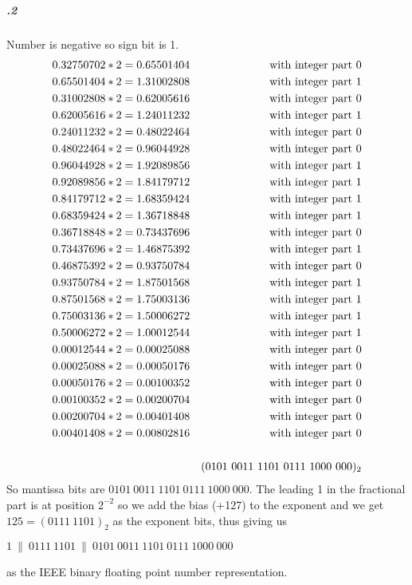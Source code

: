 \documentclass[11pt,letterpaper]{article}
\begin{document}
		\subparagraph{.2}
		Number is negative so sign bit is 1.
		\begin{align*}
		0.32750702 * 2 &= 0.65501404&\textnormal{with integer part 0}\\
		0.65501404 * 2 &= 1.31002808&\textnormal{with integer part 1}\\
		0.31002808 * 2 &= 0.62005616&\textnormal{with integer part 0}\\
		0.62005616 * 2 &= 1.24011232&\textnormal{with integer part 1}\\
		0.24011232 * 2 &= 0.48022464&\textnormal{with integer part 0}\\
		0.48022464 * 2 &= 0.96044928&\textnormal{with integer part 0}\\
		0.96044928 * 2 &= 1.92089856&\textnormal{with integer part 1}\\
		0.92089856 * 2 &= 1.84179712&\textnormal{with integer part 1}\\
		0.84179712 * 2 &= 1.68359424&\textnormal{with integer part 1}\\
		0.68359424 * 2 &= 1.36718848&\textnormal{with integer part 1}\\
		0.36718848 * 2 &= 0.73437696&\textnormal{with integer part 0}\\
		0.73437696 * 2 &= 1.46875392&\textnormal{with integer part 1}\\
		0.46875392 * 2 &= 0.93750784&\textnormal{with integer part 0}\\
		0.93750784 * 2 &= 1.87501568&\textnormal{with integer part 1}\\
		0.87501568 * 2 &= 1.75003136&\textnormal{with integer part 1}\\
		0.75003136 * 2 &= 1.50006272&\textnormal{with integer part 1}\\
		0.50006272 * 2 &= 1.00012544&\textnormal{with integer part 1}\\
		0.00012544 * 2 &= 0.00025088&\textnormal{with integer part 0}\\
		0.00025088 * 2 &= 0.00050176&\textnormal{with integer part 0}\\
		0.00050176 * 2 &= 0.00100352&\textnormal{with integer part 0}\\
		0.00100352 * 2 &= 0.00200704&\textnormal{with integer part 0}\\
		0.00200704 * 2 &= 0.00401408&\textnormal{with integer part 0}\\
		0.00401408 * 2 &= 0.00802816&\textnormal{with integer part 0}\\
		\\
		&&(0101\ 0011\ 1101\ 0111\ 1000\ 000)_2
		\end{align*}
		So mantissa bits are $0101\ 0011\ 1101\ 0111\ 1000\ 000$.\newline
		The leading 1 in the fractional part is at position $2^{-2}$ so we add the bias (+127) to the exponent and we get $125 = (0111\ 1101)_2$ as the exponent bits, thus giving us
		\begin{center}
		$1\ \|\ 0111\ 1101\ \|\ 0101\ 0011\ 1101\ 0111\ 1000\ 000$
		\end{center}
		as the IEEE binary floating point number representation.
		
		
\end{document}
